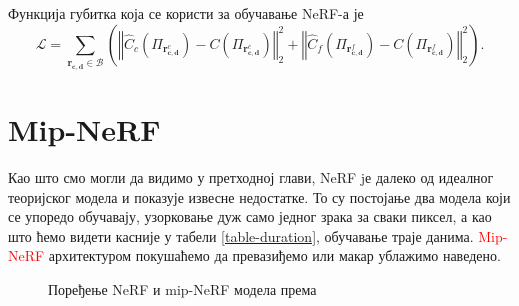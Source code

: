 \documentclass[12pt, a4paper, twoside]{book}
\numberwithin{equation}{chapter}
\numberwithin{theorem}{section}
\numberwithin{definition}{section}
\numberwithin{definitionChapter}{chapter}
\begin{document}

Функција губитка која се користи за обучавање NeRF-а је
\begin{equation}
	\mathcal{L} = \sum_{\mathbf{r_{c, d}} \in \mathcal{B}}
 	\left(
 	\left\Vert \hat{C}_c\left(\Pi_{\mathbf{r}^{c}_{\mathbf{c}, \mathbf{d}}}\right) -
 		C\left(\Pi_{\mathbf{r}^{c}_{\mathbf{c}, \mathbf{d}}}\right) \right\Vert^2_2 +
	\left\Vert \hat{C}_f\left(\Pi_{\mathbf{r}^{f}_{\mathbf{c}, \mathbf{d}}}\right) -
		C\left(\Pi_{\mathbf{r}^{f}_{\mathbf{c}, \mathbf{d}}}\right) \right\Vert^2_2
	\right).
	\label{eqn-nerf-loss}
\end{equation}

\section{Mip-NeRF}
Као што смо могли да видимо у претходној глави, NeRF jе далеко од идеалног теоријског модела и
показује извесне недостатке. То су постојање два модела који се упоредо обучавају, узорковање
дуж само једног зрака за сваки пиксел, а као што ћемо видети касније у табели \ref{table-duration},
обучавање траје данима. \textcolor{red}{Mip-NeRF} архитектуром покушаћемо да превазиђемо или макар ублажимо наведено.

\begin{figure}[H]
	\begin{center}
	\end{center}
	\caption{Поређење NeRF и mip-NeRF модела према \cite{mip-nerf}}
	\label{fig-nerf-vs-mipnerf}
\end{figure}
\end{document}
